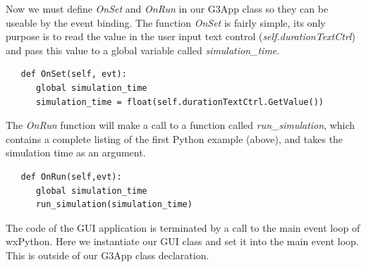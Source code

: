 \documentclass[12pt]{article}
\begin{document}


Now we must define {\it OnSet} and {\it OnRun} in our G3App class so
they can be useable by the event binding. The function {\it OnSet} 
is fairly simple, its only purpose is to read the value in the 
user input text control ({\it self.durationTextCtrl}) and pass this value
to a global variable called {\it simulation\_time}.

{\footnotesize
  \resetlinenumber[12]
  \linenumbers
\begin{verbatim}
   def OnSet(self, evt):
      global simulation_time
      simulation_time = float(self.durationTextCtrl.GetValue())
 \end{verbatim}
}

The {\it OnRun} function will make a call to a function called {\it run\_simulation},
which contains a complete listing of the first Python example (above), 
and takes the simulation time as an argument. 

{\footnotesize
  \resetlinenumber[15]
  \linenumbers
\begin{verbatim}
   def OnRun(self,evt):
      global simulation_time
      run_simulation(simulation_time)
\end{verbatim}
}
 

    

The code of the GUI application is terminated by a call to the main
event loop of wxPython.  Here we instantiate our GUI class and set it
into the main event loop. This is outside of our G3App class
declaration.
\end{document}

